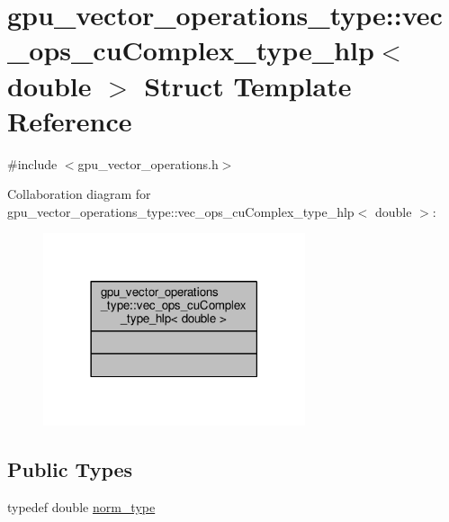 \hypertarget{structgpu__vector__operations__type_1_1vec__ops__cuComplex__type__hlp_3_01double_01_4}{\section{gpu\-\_\-vector\-\_\-operations\-\_\-type\-:\-:vec\-\_\-ops\-\_\-cu\-Complex\-\_\-type\-\_\-hlp$<$ double $>$ Struct Template Reference}
\label{structgpu__vector__operations__type_1_1vec__ops__cuComplex__type__hlp_3_01double_01_4}
}


{\ttfamily \#include $<$gpu\-\_\-vector\-\_\-operations.\-h$>$}



Collaboration diagram for gpu\-\_\-vector\-\_\-operations\-\_\-type\-:\-:vec\-\_\-ops\-\_\-cu\-Complex\-\_\-type\-\_\-hlp$<$ double $>$\-:\nopagebreak
\begin{figure}[H]
\begin{center}
\leavevmode
\includegraphics[width=218pt]{structgpu__vector__operations__type_1_1vec__ops__cuComplex__type__hlp_3_01double_01_4__coll__graph}
\end{center}
\end{figure}
\subsection*{Public Types}
\begin{DoxyCompactItemize}
\item 
typedef double \hyperlink{structgpu__vector__operations__type_1_1vec__ops__cuComplex__type__hlp_3_01double_01_4_add361fe5e712d2fc1e3bc5142c49b6d0}{norm\-\_\-type}
\end{DoxyCompactItemize}


